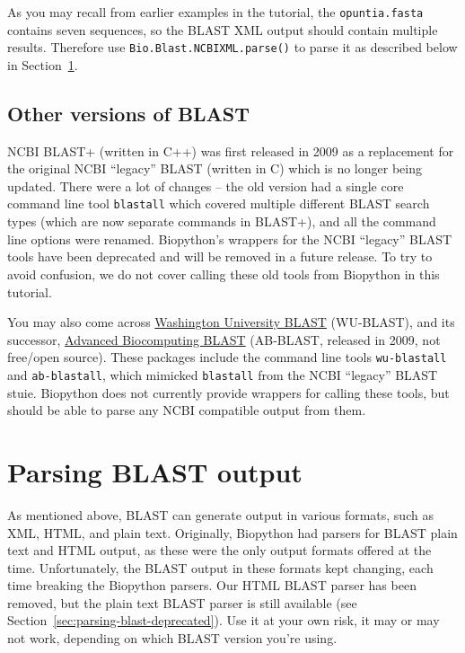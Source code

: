\documentclass{report}
\begin{document}
As you may recall from earlier examples in the tutorial, the \verb|opuntia.fasta|
contains seven sequences, so the BLAST XML output should contain multiple results.
Therefore use \verb|Bio.Blast.NCBIXML.parse()| to parse it as described below in
Section~\ref{sec:parsing-blast}.

\subsection{Other versions of BLAST}

NCBI BLAST+ (written in C++) was first released in 2009 as a replacement for
the original NCBI ``legacy'' BLAST (written in C) which is no longer being updated.
There were a lot of changes -- the old version had a single core command line
tool \verb|blastall| which covered multiple different BLAST search types (which
are now separate commands in BLAST+), and all the command line options
were renamed.
Biopython's wrappers for the NCBI ``legacy'' BLAST tools have been deprecated
and will be removed in a future release.
To try to avoid confusion, we do not cover calling these old tools from Biopython
in this tutorial.

You may also come across \href{http://blast.wustl.edu/}{Washington University BLAST}
(WU-BLAST), and its successor, \href{http://blast.advbiocomp.com}{Advanced Biocomputing
BLAST} (AB-BLAST, released in 2009, not free/open source). These packages include
the command line tools \verb|wu-blastall| and \verb|ab-blastall|, which mimicked
\verb|blastall| from the NCBI ``legacy'' BLAST stuie.
Biopython does not currently provide wrappers for calling these tools, but should be able
to parse any NCBI compatible output from them.

\section{Parsing BLAST output}
\label{sec:parsing-blast}

As mentioned above, BLAST can generate output in various formats, such as
XML, HTML, and plain text. Originally, Biopython had parsers for BLAST
plain text and HTML output, as these were the only output formats offered
at the time. Unfortunately, the BLAST output in these formats kept changing,
each time breaking the Biopython parsers. Our HTML BLAST parser has been
removed, but the plain text BLAST parser is still available (see
Section~\ref{sec:parsing-blast-deprecated}). Use it at your own risk,
it may or may not work, depending on which BLAST version you're using.
\end{document}
